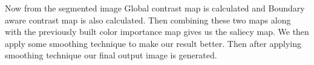 \noindent
Now from the segmented image Global contrast map is calculated and Boundary aware contrast map is also calculated. Then combining these two maps along with the previously built color importance map gives us the saliecy map. We then apply some smoothing technique to make our result better. Then after applying smoothing technique our final output image is generated.

